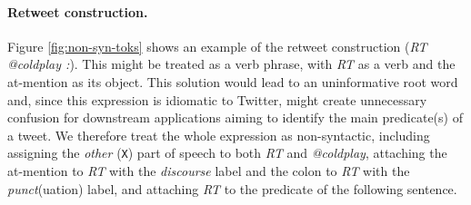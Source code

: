 \documentclass[11pt,a4paper]{article}
\newcommand{\heart}{\ensuremath\heartsuit}
\begin{document}
%


\paragraph{Retweet construction.} Figure \ref{fig:non-syn-toks} shows
an example of the retweet construction (\emph{RT @coldplay :}).  This
might be treated as a verb phrase, with \emph{RT} as a verb and the
at-mention as its object.  This solution would lead to an uninformative root
word and, since this expression is idiomatic to Twitter, might create
unnecessary confusion for downstream applications aiming to identify
the main predicate(s) of a tweet.  We therefore treat the whole
expression as non-syntactic, including assigning the \emph{other}
(\texttt{X}) part of speech to both \emph{RT} and \emph{@coldplay},
attaching the at-mention to \emph{RT} with the \emph{discourse}
label and the colon to \emph{RT} with the \emph{punct}(uation) label,
and attaching \emph{RT} to the predicate of the following sentence. 
\end{document}

